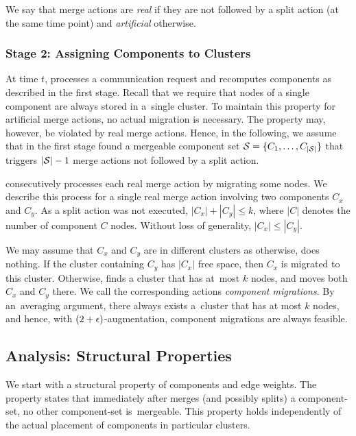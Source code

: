 We say that merge actions are \emph{real} if they are not followed
by a split action (at the same time point) and \emph{artificial} otherwise. 



\subsubsection{Stage 2: Assigning Components to Clusters}

At time $t$, \CREP processes a communication request and recomputes components
as described in the first stage. Recall that we require that nodes of a single
component are always stored in a~single cluster. To maintain this property for
artificial merge actions, no actual migration is necessary. The property may,
however, be violated by real merge actions. Hence, in the following, we assume
that in the first stage \CREP found a mergeable component set $\mathcal{S} = \{ C_1, 
\ldots, C_{|\mathcal{S}|} \}$ that triggers $|\mathcal{S}|-1$ merge actions not 
followed by a split action.

\CREP consecutively processes each real merge action by migrating some nodes.
We describe this process for a single real merge action involving two
components $C_x$ and $C_y$. As a split action was not executed, $|C_x| +
|C_y| \leq k$, where $|C|$ denotes the number of component $C$ nodes.
Without loss of generality, $|C_x| \leq |C_y|$.

We may assume that $C_x$ and $C_y$ are in different clusters as otherwise,
\CREP does nothing. If the cluster containing $C_y$ has $|C_x|$ free space,
then $C_x$ is migrated to this cluster. Otherwise, \CREP finds a cluster that
has at~most $k$ nodes, and moves both $C_x$ and $C_y$ there. We call the
corresponding actions \emph{component migrations}. By an~averaging argument,
there always exists a~cluster that has at most $k$ nodes, and hence, with
$(2+\epsilon)$-augmentation, component migrations are always feasible.


\subsection{Analysis: Structural Properties}

We start with a structural property of components and edge weights.
The property states that immediately after \CREP merges (and
possibly splits) a component-set, no other component-set is~mergeable. This
property holds independently of the actual placement of components in
particular clusters.

